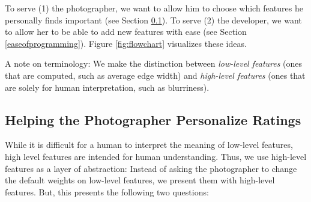 \documentclass[11pt,letter]{article}
\begin{document}
To serve (1) the photographer, we want to allow him to choose which features he personally finds important (see Section \ref{abstraction}). To serve (2) the developer, we want to allow her to be able to add new features with ease (see Section \ref{easeofprogramming}). Figure \ref{fig:flowchart} visualizes these ideas.

A note on terminology: We make the distinction between \textit{low-level features} (ones that are computed, such as average edge width) and \textit{high-level features} (ones that are solely for human interpretation, such as blurriness).

\begin{figure*}[b!]
  \centering
  \caption{An example flowchart. Here, the application computes three low-level features. All three combine to rate the two high-level features: blurriness and exposure. The developer controls which features are present. The photographer's personal preferences can change the default weights on high-level features.}
  \label{fig:flowchart}
\end{figure*}

\subsection{Helping the Photographer Personalize Ratings}
\label{abstraction}
While it is difficult for a human to interpret the meaning of low-level features, high level features are intended for human understanding. Thus, we use high-level features as a layer of abstraction: Instead of asking the photographer to change the default weights on low-level features, we present them with high-level features. But, this presents the following two questions:
\end{document}
